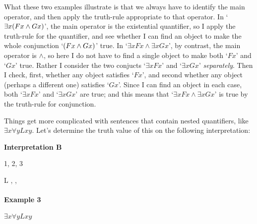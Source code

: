 What these two examples illustrate is that we always have to identify the main operator, and then apply the truth-rule appropriate to that operator.  In `$\exists x(Fx \wedge Gx)$', the main operator is the existential quantifier, so I apply the truth-rule for the quantifier, and see whether I can find an object to make the whole conjunction `$(Fx \wedge Gx)$' true.  In `$\exists x Fx \land \exists x Gx$', by contrast, the main operator is $\land$, so here I do not have to find a single object to make both `$Fx$' and `$Gx$' true.  Rather I consider the two conjucts `$\exists x Fx$' and `$\exists x Gx$' \emph{separately}. Then I check, first, whether any object satisfies `$Fx$', and second whether any object (perhaps a different one) satisfies `$Gx$'.  Since I can find an object in each case, both `$\exists x Fx$' and `$\exists x Gx$' are true; and this means that `$\exists x Fx \land \exists x Gx$' is true by the truth-rule for conjunction.

Things get  more complicated with sentences that contain nested quantifiers, like $\exists x\forall yLxy$.  Let's determine the truth value of this on the following interpretation:\\

\begin{minipage}{\textwidth}
\begin{center}
\textbf{Interpretation B}
\begin{multicols}{2}
	\begin{ekey}
		\item[\text{Domain}] 1, 2, 3
		\item[L] , , 
	\end{ekey}
\columnbreak

\end{multicols}
\end{center}
\end{minipage}

\paragraph{Example 3} $\exists x\forall yLxy$

